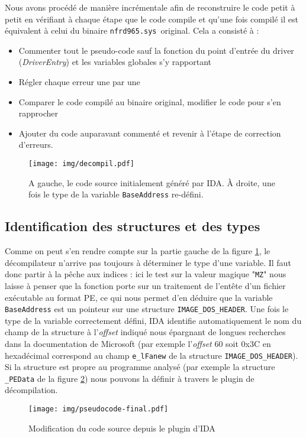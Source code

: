 \documentclass[times,11pt,fullpage]{article}
\newenvironment{changemargin}[2]{\begin{list}{}{%
\setlength{\topsep}{0pt}%
\setlength{\leftmargin}{0pt}%
\setlength{\rightmargin}{0pt}%
\setlength{\listparindent}{\parindent}%
\setlength{\itemindent}{\parindent}%
\setlength{\parsep}{0pt plus 1pt}%
\addtolength{\leftmargin}{#1}%
\addtolength{\rightmargin}{#2}%
}\item }{\end{list}}
\newcommand{\driver}{\texttt{nfrd965.sys}}
\begin{document}
Nous avons procédé de manière incrémentale afin de reconstruire le code petit à petit en vérifiant à chaque étape que le code compile et qu'une fois compilé il est équivalent à celui du binaire \driver\ original. 
Cela a consisté à :
\begin{itemize}
 \item Commenter tout le pseudo-code sauf la fonction du point d'entrée du driver (\emph{DriverEntry}) et les variables globales s'y rapportant
 \item Régler chaque erreur une par une
 \item Comparer le code compilé au binaire original, modifier le code pour s'en rapprocher
 \item Ajouter du code auparavant commenté et revenir à l'étape de correction d'erreurs.
\end{itemize}

\begin{figure}[H]
\begin{changemargin}{-2cm}{-2cm}
\texttt{[image: img/decompil.pdf]}
\end{changemargin}
\caption{A gauche, le code source initialement généré par IDA. À droite, une fois le type de la variable \texttt{BaseAddress} re-défini.}
\label{fig:decompil}
\end{figure}

\subsection{Identification des structures et des types}
Comme on peut s'en rendre compte sur la partie gauche de la figure \ref{fig:decompil}, le décompilateur n'arrive pas toujours à déterminer le type d'une variable. 
Il faut donc partir à la pêche aux indices : ici le test sur la valeur magique "\texttt{MZ}" nous laisse à penser que la fonction porte sur un traitement de l'entête d'un fichier exécutable au format PE, ce qui nous permet d'en déduire que la variable \texttt{BaseAddress} est un pointeur sur une structure \texttt{IMAGE\_DOS\_HEADER}. Une fois le type de la variable correctement défini, IDA identifie automatiquement le nom du champ de la structure à l'{\em offset} indiqué nous épargnant de longues recherches dans la documentation de Microsoft (par exemple l'{\em offset} 60 soit 0x3C en hexadécimal correspond au champ \texttt{e\_lFanew} de la structure \texttt{IMAGE\_DOS\_HEADER}). Si la structure est propre au programme analysé (par exemple la structure \texttt{\_PEData} de la figure \ref{fig:pseudocodefinal}) nous pouvons la définir à travers le plugin de décompilation.%
\begin{figure}
\texttt{[image: img/pseudocode-final.pdf]}
\caption{Modification du code source depuis le plugin d'IDA}
\label{fig:pseudocodefinal}
\end{figure}
\end{document}
